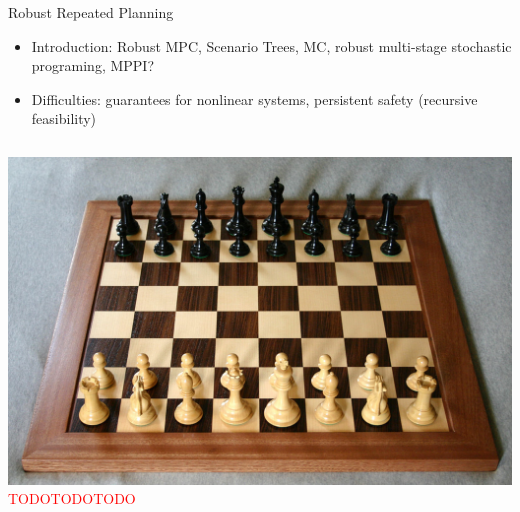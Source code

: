 \documentclass[lecture]{beamer}
\begin{document}
\begin{frame}{\normalsize Robust Repeated Planning}
\footnotesize
\begin{itemize}
\item Introduction: Robust MPC, Scenario Trees, MC, robust multi-stage stochastic programing, MPPI?
\item Difficulties: guarantees for nonlinear systems, persistent safety (recursive feasibility)
\end{itemize}

\begin{columns}[t]


\includegraphics[width=1\textwidth,clip]{Figures/Chess.pdf}
\textcolor{red}{TODOTODOTODO}
\end{columns}

\end{frame}
\end{document}
